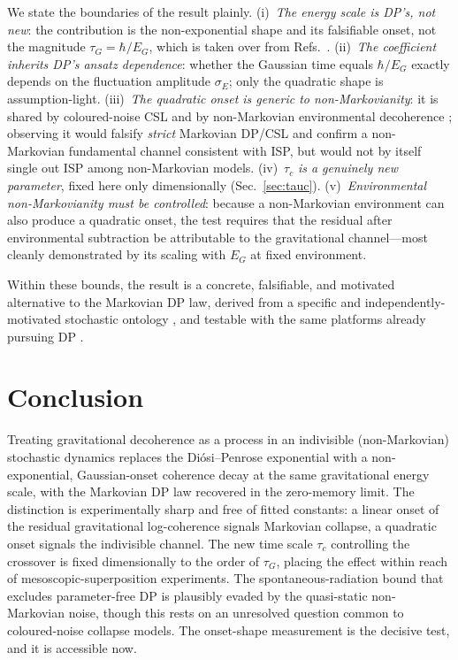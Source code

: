 \documentclass[aps,pra,preprint,amsmath,amssymb,nofootinbib,superscriptaddress]{revtex4-2}
\begin{document}
We state the boundaries of the result plainly. (i)~\emph{The energy scale is
DP's, not new}: the contribution is the non-exponential shape and its falsifiable
onset, not the magnitude $\tau_G=\hbar/E_G$, which is taken over from
Refs.~\cite{penrose1996,diosi1989,diosi1987}. (ii)~\emph{The coefficient inherits
DP's ansatz dependence}: whether the Gaussian time equals $\hbar/E_G$ exactly
depends on the fluctuation amplitude $\sigma_E$; only the quadratic shape is
assumption-light. (iii)~\emph{The quadratic onset is generic to
non-Markovianity}: it is shared by coloured-noise CSL and by non-Markovian
environmental decoherence \cite{carlesso2018,breuer2016,misra1977}; observing it
would falsify \emph{strict} Markovian DP/CSL and confirm a non-Markovian
fundamental channel consistent with ISP, but would not by itself single out ISP
among non-Markovian models. (iv)~$\tau_c$ \emph{is a genuinely new parameter},
fixed here only dimensionally (Sec.~\ref{sec:tauc}). (v)~\emph{Environmental
non-Markovianity must be controlled}: because a non-Markovian environment can also
produce a quadratic onset, the test requires that the residual after
environmental subtraction be attributable to the gravitational channel---most
cleanly demonstrated by its scaling with $E_G$ at fixed environment.

Within these bounds, the result is a concrete, falsifiable, and motivated
alternative to the Markovian DP law, derived from a specific and
independently-motivated stochastic ontology
\cite{barandes2023corr,barandes2023thm}, and testable with the same platforms
already pursuing DP \cite{arndt2014,bose2017,marshall2003,nimmrichter2013}.

\section{Conclusion}

Treating gravitational decoherence as a process in an indivisible (non-Markovian)
stochastic dynamics replaces the Di\'osi--Penrose exponential with a
non-exponential, Gaussian-onset coherence decay at the same gravitational energy
scale, with the Markovian DP law recovered in the zero-memory limit. The
distinction is experimentally sharp and free of fitted constants: a linear onset
of the residual gravitational log-coherence signals Markovian collapse, a
quadratic onset signals the indivisible channel. The new time scale $\tau_c$
controlling the crossover is fixed dimensionally to the order of $\tau_G$,
placing the effect within reach of mesoscopic-superposition experiments. The
spontaneous-radiation bound that excludes parameter-free DP is plausibly evaded
by the quasi-static non-Markovian noise, though this rests on an unresolved
question common to coloured-noise collapse models. The onset-shape measurement is
the decisive test, and it is accessible now.
\end{document}
